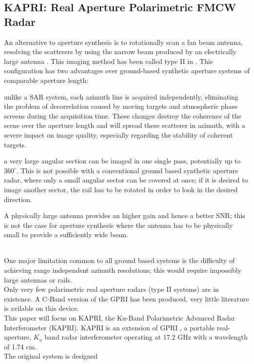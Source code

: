 \subsection{KAPRI: Real Aperture Polarimetric FMCW Radar}
An alternative to aperture synthesis is to rotationally scan a fan beam antenna, resolving the scatterers by using the narrow beam produced by an electrically large antenna \cite{Werner2008}. This imaging method has been called type II in \cite{Caduff2015}. 
This configuration has two advantages over ground-based synthetic aperture systems\cite{Monserrat2014} of comparable aperture length: \begin{enumerate*}
  \item unlike a SAR system, each azimuth line is 
acquired independently, eliminating the problem of decorrelation caused by moving targets and atmospheric phase screens during the acquisition time. 
These changes destroy the coherence of the scene over the aperture length and will spread these scatterer in azimuth, with a severe impact on image quality, especially regarding the stability of coherent targets.\\ \item a very large 
angular section can be imaged in one single pass, potentially up to $360^{\circ}$. This is not possible with a conventional ground based synthetic aperture radar, where only a small angular sector
can be covered at once; if it is desired to image another sector, the rail has to be rotated in order to look in the desired direction.\\
\item A physically large antenna provides an higher gain and hence a better SNR; this is not the case for  aperture synthesis  where the antenna has to be physically small to provide a sufficiently wide beam.\\
\end{enumerate*}\\
One major limitation common to all ground based systems is the difficulty of achieving range independent azimuth resolutions; this would require impossibly large antennas or rails.\\
Only very few polarimetric real aperture radars (type II systems) are in existence. A C-Band version of the GPRI has been produced\cite{Cherukumilli2012}, very little literature is avilable on this device.\\ This paper will focus on KAPRI, the Ku-Band Polarimetric Advanced Radar Interferometer (KAPRI). KAPRI is an extension of GPRI \cite{werner_gpri_2012,Strozzi2011, Werner2008}, a portable real-aperture, $K_u$ band radar interferometer operating at 17.2 GHz with a wavelength of 1.74 cm.\\ The original system is designed 
